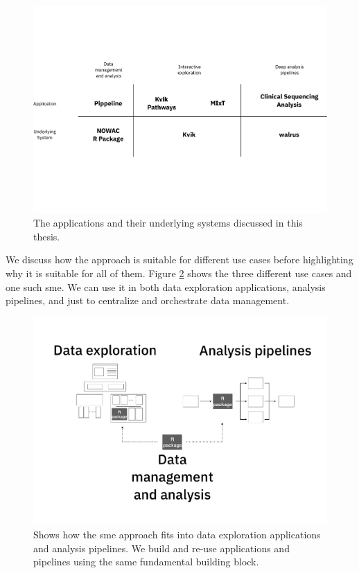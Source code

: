 \begin{figure}
\includegraphics[width=\textwidth]{figures/overall-arch.pdf}
    \caption{The applications and their underlying systems discussed in this
    thesis. } 
    \label{overview-fig}
\end{figure} 


We discuss how the approach is suitable for different use cases before
highlighting why it is suitable for all of them. Figure \ref{overview-full}
shows the three different use cases and one such \gls{sme}. We can use it in
both data exploration applications, analysis pipelines, and just to centralize
and orchestrate data management. 

\begin{figure}
\includegraphics[width=\textwidth]{figures/overview-full.pdf}
    \caption{Shows how the \gls{sme} approach fits into data exploration
    applications and analysis pipelines. We build and re-use applications and
    pipelines using the same fundamental building block.} 
    \label{overview-full}
\end{figure} 

